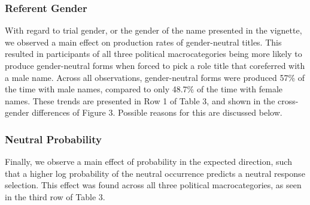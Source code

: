 \documentclass[10pt,letterpaper]{article}
\begin{document}
	
	\subsubsection{Referent Gender} With regard to trial gender, or the gender of the name presented in the vignette, we observed a main effect on production rates of gender-neutral titles. This resulted in participants of all three political macrocategories being more likely to produce gender-neutral forms when forced to pick a role title that coreferred with a male name. Across all observations, gender-neutral forms were produced 57\% of the time with male names, compared to only 48.7\% of the time with female names. These trends are presented in Row 1 of Table 3, and shown in the cross-gender differences of Figure 3. Possible reasons for this are discussed below.
	
	\subsubsection{Neutral Probability} Finally, we observe a main effect of probability in the expected direction, such that a higher log probability of the neutral occurrence predicts a neutral response selection. This effect was found across all three political macrocategories, as seen in the third row of Table 3.


			
	
\end{document}
